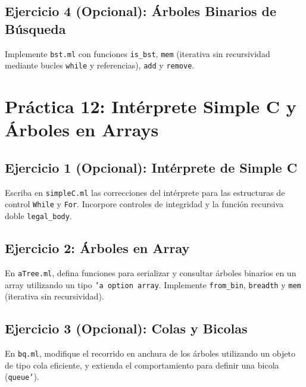\documentclass[11pt,a4paper]{article}
\begin{document}
\subsection{Ejercicio 4 (Opcional): Árboles Binarios de Búsqueda}
Implemente \texttt{bst.ml} con funciones \texttt{is\_bst}, \texttt{mem} (iterativa sin recursividad mediante bucles \texttt{while} y referencias), \texttt{add} y \texttt{remove}.


\section{Práctica 12: Intérprete Simple C y Árboles en Arrays}
\subsection{Ejercicio 1 (Opcional): Intérprete de Simple C}
Escriba en \texttt{simpleC.ml} las correcciones del intérprete para las estructuras de control \texttt{While} y \texttt{For}. Incorpore controles de integridad y la función recursiva doble \texttt{legal\_body}.

\subsection{Ejercicio 2: Árboles en Array}
En \texttt{aTree.ml}, defina funciones para serializar y consultar árboles binarios en un array utilizando un tipo \texttt{'a option array}. Implemente \texttt{from\_bin}, \texttt{breadth} y \texttt{mem} (iterativa sin recursividad).

\subsection{Ejercicio 3 (Opcional): Colas y Bicolas}
En \texttt{bq.ml}, modifique el recorrido en anchura de los árboles utilizando un objeto de tipo cola eficiente, y extienda el comportamiento para definir una bicola (\texttt{queue'}).
\end{document}
